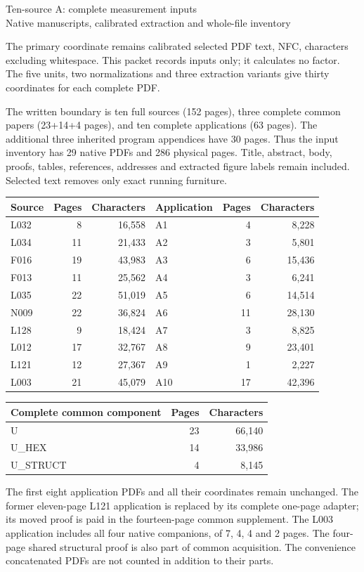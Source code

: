 \documentclass[10pt]{article}
\begin{document}
\begin{center}{\Large Ten-source A: complete measurement inputs}\\[4pt]
Native manuscripts, calibrated extraction and whole-file inventory\end{center}
The primary coordinate remains calibrated selected PDF text, NFC, characters
excluding whitespace. This packet records inputs only; it calculates no factor.
The five units, two normalizations and three extraction variants give thirty
coordinates for each complete PDF.

The written boundary is ten full sources (152 pages), three complete common
papers (23+14+4 pages), and ten complete applications (63 pages). The additional
three inherited program appendices have 30 pages. Thus the input inventory has
29 native PDFs and 286 physical pages. Title, abstract, body, proofs, tables,
references, addresses and extracted figure labels remain included. Selected
text removes only exact running furniture.

\begin{center}\begin{tabular}{lrrlrr}\toprule
Source & Pages & Characters & Application & Pages & Characters\\\midrule
L032 & 8 & 16,558 & A1 & 4 & 8,228\\
L034 & 11 & 21,433 & A2 & 3 & 5,801\\
F016 & 19 & 43,983 & A3 & 6 & 15,436\\
F013 & 11 & 25,562 & A4 & 3 & 6,241\\
L035 & 22 & 51,019 & A5 & 6 & 14,514\\
N009 & 22 & 36,824 & A6 & 11 & 28,130\\
L128 & 9 & 18,424 & A7 & 3 & 8,825\\
L012 & 17 & 32,767 & A8 & 9 & 23,401\\
L121 & 12 & 27,367 & A9 & 1 & 2,227\\
L003 & 21 & 45,079 & A10 & 17 & 42,396\\
\bottomrule\end{tabular}\end{center}
\begin{center}\begin{tabular}{lrr}\toprule
Complete common component & Pages & Characters\\\midrule
U & 23 & 66,140\\
U\_HEX & 14 & 33,986\\
U\_STRUCT & 4 & 8,145\\
\bottomrule\end{tabular}\end{center}
The first eight application PDFs and all their coordinates remain unchanged.
The former eleven-page L121 application is replaced by its complete one-page
adapter; its moved proof is paid in the fourteen-page common supplement.
The L003 application includes all four native companions, of 7, 4, 4 and 2 pages.
The four-page shared structural proof is also part of common acquisition.
The convenience concatenated PDFs are not counted in addition to their parts.
\end{document}
